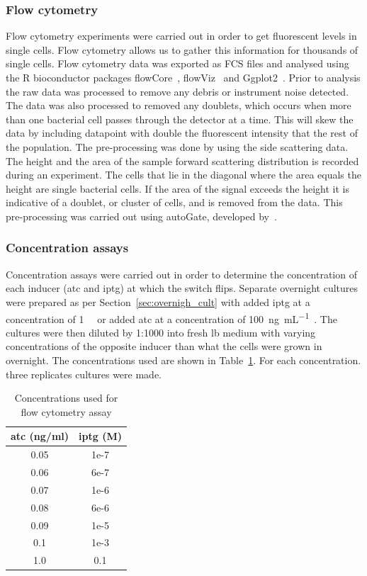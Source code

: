 \subsubsection{Flow cytometry}
Flow cytometry experiments were carried out in order to get fluorescent levels in single cells. Flow cytometry allows us to gather this information for thousands of single cells. Flow cytometry data was exported as FCS files and analysed using the R bioconductor packages flowCore~\autocite{flowCore:man}, flowViz~\autocite{flowViz:man} and Ggplot2~\autocite{ggplot2:bk}. Prior to analysis the raw data was processed to remove any debris or instrument noise detected. The data was also processed to removed any doublets, which occurs when more than one bacterial  cell passes through the detector at a time. This will skew the data by including datapoint with double the fluorescent intensity that the rest of the population. The pre-processing was done by using the side scattering data. The height and the area of the sample forward scattering distribution is recorded during an experiment. The cells that lie in the diagonal where the area equals the height are single bacterial cells. If the area of the signal exceeds the height it is indicative of a doublet, or cluster of cells, and is removed from the data. This pre-processing was carried out using autoGate, developed by~\textcite{Fedorec2016}. 



\subsubsection{Concentration assays}
\label{sec:flo_conc}
Concentration assays were carried out in order to determine the concentration of each inducer (\acrshort{atc} and \acrshort{iptg}) at which the switch flips.  Separate overnight cultures were prepared as per Section~\ref{sec:overnigh_cult} with added \acrshort{iptg} at a concentration of \SI{1}{\milli\molar} or added \acrshort{atc} at a concentration of \SI{100}{\nano\gram\per\milli\liter}~\autocite{Litcofsky:2012gr}. The cultures were then diluted by 1:1000 into fresh \acrshort{lb} medium with varying concentrations of the opposite inducer than what the cells were grown in overnight. The concentrations used are shown in Table~\ref{tab:flow_conc}. For each concentration. three replicates cultures were made.


\begin{table}[tb]
\centering
\caption{Concentrations used for flow cytometry assay}
\label{tab:flow_conc}
\begin{tabular}{@{}cc@{}}
\toprule
\acrshort{atc} (ng/ml)  & \acrshort{iptg} (M) \\ \midrule
0.05 & 1e-7 \\
0.06 & 6e-7 \\
0.07 & 1e-6 \\
0.08 & 6e-6 \\
0.09 & 1e-5 \\
0.1  & 1e-3 \\
1.0  & 0.1  \\ \bottomrule
\end{tabular}
\end{table}

